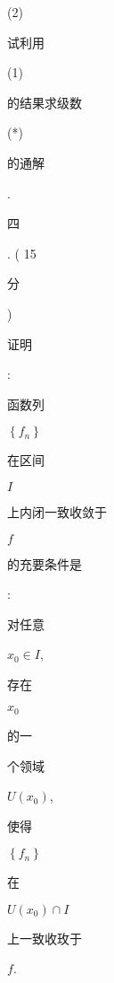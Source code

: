 \documentclass[10pt]{article}
\begin{document}
(2) \begin{CJK}{UTF8}{mj}试利用\end{CJK} (1) \begin{CJK}{UTF8}{mj}的结果求级数\end{CJK} (*) \begin{CJK}{UTF8}{mj}的通解\end{CJK}.

\begin{CJK}{UTF8}{mj}四\end{CJK}. ( 15 \begin{CJK}{UTF8}{mj}分\end{CJK}) \begin{CJK}{UTF8}{mj}证明\end{CJK}: \begin{CJK}{UTF8}{mj}函数列\end{CJK} $\left\{f_{n}\right\}$ \begin{CJK}{UTF8}{mj}在区间\end{CJK} $I$ \begin{CJK}{UTF8}{mj}上内闭一致收敛于\end{CJK} $f$ \begin{CJK}{UTF8}{mj}的充要条件是\end{CJK}: \begin{CJK}{UTF8}{mj}对任意\end{CJK} $x_{0} \in I$, \begin{CJK}{UTF8}{mj}存在\end{CJK} $x_{0}$ \begin{CJK}{UTF8}{mj}的一\end{CJK} \begin{CJK}{UTF8}{mj}个领域\end{CJK} $U\left(x_{0}\right)$, \begin{CJK}{UTF8}{mj}使得\end{CJK} $\left\{f_{n}\right\}$ \begin{CJK}{UTF8}{mj}在\end{CJK} $U\left(x_{0}\right) \cap I$ \begin{CJK}{UTF8}{mj}上一致收玫于\end{CJK} $f$.
\end{document}
